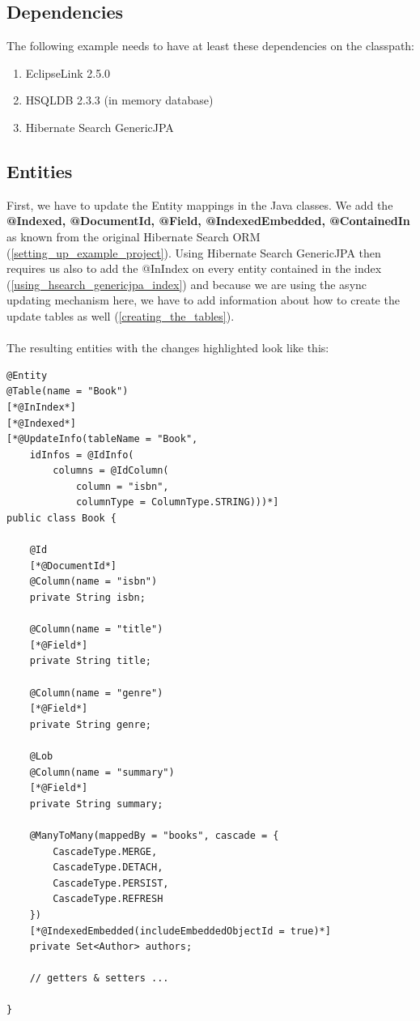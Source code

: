 \subsection{Dependencies}

The following example needs to have at least these dependencies on the classpath:

\begin{enumerate}
	\item{EclipseLink 2.5.0}
	\item{HSQLDB 2.3.3 (in memory database)}
	\item{Hibernate Search GenericJPA}
\end{enumerate}

\pagebreak

\subsection{Entities}
First, we have to update the Entity mappings in the Java classes. We add the \textbf{@Indexed, @DocumentId, @Field, @IndexedEmbedded, @ContainedIn} as known from the original Hibernate Search ORM (\ref{setting_up_example_project}). Using Hibernate Search GenericJPA then requires us also to add the @InIndex on every entity contained in the index (\ref{using_hsearch_genericjpa_index}) and because we are using the async updating mechanism here, we have to add information about how to create the update tables as well (\ref{creating_the_tables}).
\\\\
The resulting entities with the changes highlighted look like this:
\\
\lstset{language=java}
\begin{lstlisting}[frame=htrbl, caption={Book.java complete}, label={lst:book.java_complete}]
@Entity
@Table(name = "Book")
[*@InIndex*]
[*@Indexed*]
[*@UpdateInfo(tableName = "Book",
	idInfos = @IdInfo(
		columns = @IdColumn(
			column = "isbn",
			columnType = ColumnType.STRING)))*]
public class Book {
	
	@Id
	[*@DocumentId*]
	@Column(name = "isbn")
	private String isbn;
	
	@Column(name = "title")
	[*@Field*]
	private String title;
	
	@Column(name = "genre")
	[*@Field*]
	private String genre;
	
	@Lob
	@Column(name = "summary")
	[*@Field*]
	private String summary;
	
	@ManyToMany(mappedBy = "books", cascade = {
		CascadeType.MERGE,
		CascadeType.DETACH,
		CascadeType.PERSIST,
		CascadeType.REFRESH
	})
	[*@IndexedEmbedded(includeEmbeddedObjectId = true)*]
	private Set<Author> authors;
	
	// getters & setters ...
	
}
\end{lstlisting}

